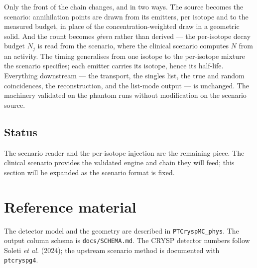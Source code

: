 \documentclass[11pt]{article}
\begin{document}
Only the front of the chain changes, and in two ways. The source becomes the scenario: annihilation
points are drawn from its emitters, per isotope and to the measured budget, in place of the
concentration-weighted draw in a geometric solid. And the count becomes \emph{given} rather than
derived --- the per-isotope decay budget $N_j$ is read from the scenario, where the clinical scenario
computes $N$ from an activity. The timing generalises from one isotope to the per-isotope mixture the
scenario specifies; each emitter carries its isotope, hence its half-life. Everything downstream ---
the transport, the singles list, the true and random coincidences, the reconstruction, and the
list-mode output --- is unchanged. The machinery validated on the phantom runs without modification on
the scenario source.

\subsection{Status}

The scenario reader and the per-isotope injection are the remaining piece. The clinical scenario
provides the validated engine and chain they will feed; this section will be expanded as the scenario
format is fixed.

\section*{Reference material}
The detector model and the geometry are described in \texttt{PTCryspMC\_phys}. The output column
schema is \texttt{docs/SCHEMA.md}. The CRYSP detector numbers follow Soleti \textit{et al.} (2024);
the upstream scenario method is documented with \texttt{ptcryspg4}.
\end{document}
